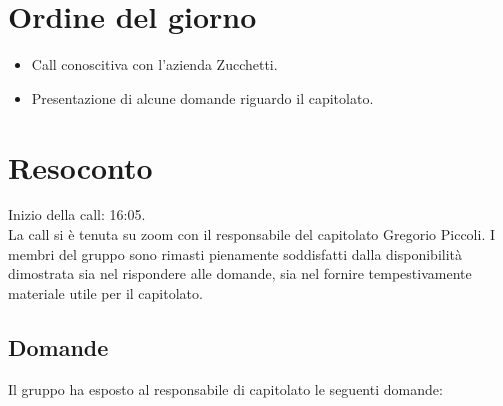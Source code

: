 \section{Ordine del giorno}

\begin{itemize}
	\item Call conoscitiva con l'azienda Zucchetti.
	\item Presentazione di alcune domande riguardo il capitolato.
\end{itemize}

\section{Resoconto}

\noindent 
Inizio della call: 16:05. \\
\noindent La call si è tenuta su zoom con il responsabile del capitolato Gregorio Piccoli. 
I membri del gruppo sono rimasti pienamente soddisfatti dalla disponibilità dimostrata sia nel rispondere alle domande, sia nel fornire tempestivamente materiale utile per il capitolato.

\subsection{Domande}

Il gruppo ha esposto al responsabile di capitolato le seguenti domande:

